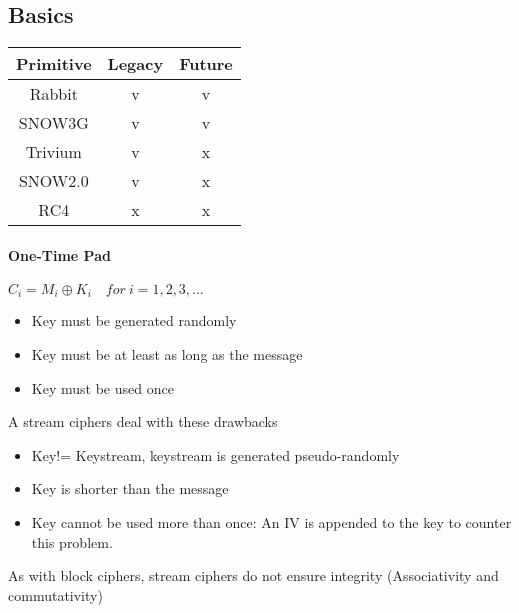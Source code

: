 \subsection{Basics}
\begin{center}
    \begin{tabular}{|c|c|c|}
        \hline
        Primitive & Legacy & Future\\
        \hline
        Rabbit & \textcolor{green!50!black}{v} & \textcolor{green!50!black}{v}\\
        SNOW3G & \textcolor{green!50!black}{v} & \textcolor{green!50!black}{v}\\
        \hline
        Trivium & \textcolor{green!50!black}{v} &
        \textcolor{red!50!black}{x}\\
        SNOW2.0 & \textcolor{green!50!black}{v} & \textcolor{red!50!black}{x}\\
        \hline
        RC4 & \textcolor{red!50!black}{x} & \textcolor{red!50!black}{x}\\
        \hline
    \end{tabular}
\end{center}

\paragraph{One-Time Pad} $C_i = M_i \oplus K_i\quad for\ i=1,2,3,\ldots$
\begin{itemize}
    \item Key must be generated randomly
    \item Key must be at least as long as the message
    \item Key must be used once
\end{itemize}
A stream ciphers deal with these drawbacks
\begin{itemize}
    \item Key!= Keystream, keystream is generated pseudo-randomly
    \item Key is shorter than the message
    \item Key cannot be used more than once: An IV is appended to the key to
    counter this problem.
\end{itemize}
As with block ciphers, stream ciphers do not ensure integrity (Associativity
and commutativity)

